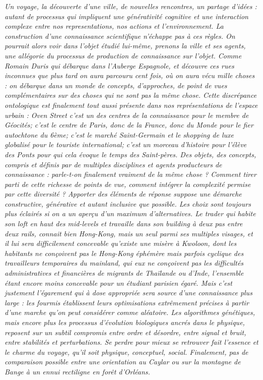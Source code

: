 \textit{Un voyage, la découverte d'une ville, de nouvelles rencontres, un partage d'idées : autant de processus qui impliquent une générativité cognitive et une interaction complexe entre nos representations, nos actions et l'environnement. La construction d'une connaissance scientifique n'échappe pas à ces règles. On pourrait alors voir dans l'objet étudié lui-même, prenons la ville et ses agents, une allégorie du processus de production de connaissance sur l'objet. Comme Romain Duris qui débarque dans l'Auberge Espagnole, et découvre ces rues inconnues que plus tard on aura parcouru cent fois, où on aura vécu mille choses : on débarque dans un monde de concepts, d'approches, de point de vues complémentaires sur des choses qui ne sont pas la même chose. Cette discrépance ontologique est finalement tout aussi présente dans nos représentations de l'espace urbain : \emph{Oven Street} c'est un des centres de la connaissance pour le membre de Géocités; c'est le centre de Paris, donc de la France, donc du Monde pour le fier autochtone du 6ème; c'est le marché Saint-Germain et le shopping de luxe globalisé pour le touriste international; c'est un morceau d'histoire pour l'élève des Ponts pour qui cela évoque le temps des Saint-pères. Des objets, des concepts, compris et définis par de multiples disciplines et agents producteurs de connaissance : parle-t-on finalement vraiment de la même chose ? Comment tirer parti de cette richesse de points de vue, comment intégrer la complexité permise par cette diversité ? Apporter des éléments de réponse suppose une démarche constructive, générative et autant inclusive que possible. Les choix sont toujours plus éclairés si on a un aperçu d'un maximum d'alternatives. Le trader qui habite son loft en haut des \emph{mid-levels} et travaille dans son building à deux pas entre deux rails, connait bien Hong-Kong, mais un seul parmi ses multiples visages, et il lui sera difficilement concevable qu'existe une misère à Kwoloon, dont les habitants ne conçoivent pas le Hong-Kong éphémère mais parfois cyclique des travailleurs temporaires du mainland, qui eux ne conçoivent pas les difficultés administratives et financières de migrants de Thaïlande ou d'Inde, l'ensemble étant encore moins concevable pour un étudiant parisien égaré. Mais c'est justement l'égarement qui à dose appropriée sera source d'une connaissance plus large : les fourmis établissent leurs optimisations extrêmement précises à partir d'une marche qu'on peut considérer comme aléatoire. Les algorithmes génétiques, mais encore plus les processus d'évolution biologiques ancrés dans le physique, reposent sur un subtil compromis entre ordre et désordre, entre signal et bruit, entre stabilités et perturbations. Se perdre pour mieux se retrouver fait l'essence et le charme du voyage, qu'il soit physique, conceptuel, social. Finalement, pas de comparaison possible entre une orientation au Caylar ou sur la montagne de Bange à un ennui rectiligne en forêt d'Orléans.}



